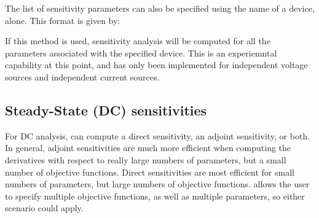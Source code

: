 The list of sensitivity parameters can also be specified using the name of a device, alone.
This format is given by:


If this method is used, sensitivity analysis will be computed for all the parameters 
associated with the specified device.  This is an experiemntal capability at this 
point, and has only been implemented for independent voltage sources and 
independent current sources.

\subsection{Steady-State (DC) sensitivities}

For DC analysis, \Xyce{} can compute a direct sensitivity, an adjoint
sensitivity, or both.  In general, adjoint sensitivities are much more
efficient when computing the derivatives with respect to really large
numbers of parameters, but a small number of objective functions.
Direct sensitivities are most efficient for small numbers of
parameters, but large numbers of objective functions.  \Xyce{} allows
the user to specify multiple objective functions, as well as multiple
parameters, so either scenario could apply.

